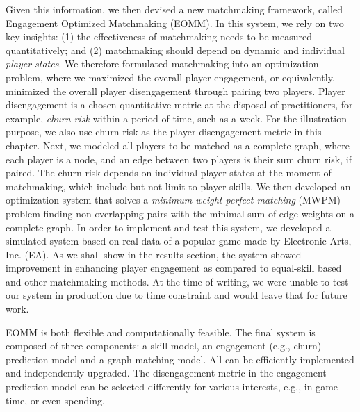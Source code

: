 Given this information, we then devised a new matchmaking framework, called Engagement Optimized Matchmaking (EOMM). In this system, we rely on two key insights: (1) the effectiveness of matchmaking needs to be measured quantitatively; and (2) matchmaking should depend on dynamic and individual \emph{player states}. We therefore formulated matchmaking into an optimization problem, where we maximized the overall player engagement, or equivalently, minimized the overall player disengagement through pairing two players. Player disengagement is a chosen quantitative metric at the disposal of practitioners, for example, \emph{churn risk} within a period of time, such as a week. For the illustration purpose, we also use churn risk as the player disengagement metric in this chapter. Next, we modeled all players to be matched as a complete graph, where each player is a node, and an edge between two players is their sum churn risk, if paired. The churn risk depends on individual player states at the moment of matchmaking, which include but not limit to player skills. We then developed an optimization system that solves a \emph{minimum weight perfect matching} (MWPM) problem finding non-overlapping pairs with the minimal sum of edge weights on a complete graph. In order to implement and test this system, we developed a simulated system based on real data of a popular game made by Electronic Arts,\! Inc.\! (EA). As we shall show in the results section, the system showed improvement in enhancing player engagement as compared to equal-skill based and other matchmaking methods. At the time of writing, we were unable to test our system in production due to time constraint and would leave that for future work.



EOMM is both flexible and computationally feasible. The final system is composed of three components: a skill model, an engagement (e.g., churn) prediction model and a graph matching model. All can be efficiently implemented and independently upgraded. The disengagement metric in the engagement prediction model can be selected differently for various interests, e.g., in-game time, or even spending. 

